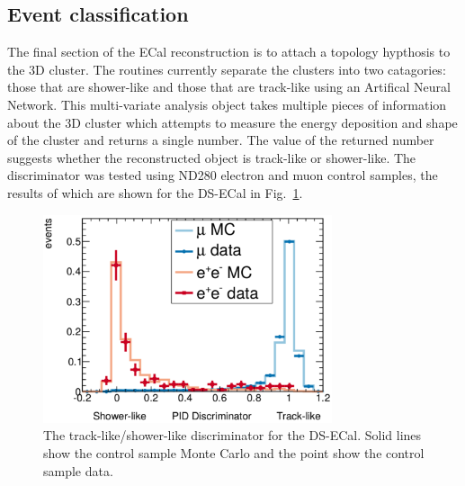 \subsection{Event classification}
\label{subsec:ECalParticleIdentification}
The final section of the ECal reconstruction is to attach a topology hypthosis to the 3D cluster.  The routines currently separate the clusters into two catagories: those that are shower-like and those that are track-like using an Artifical Neural Network.  This multi-variate analysis object takes multiple pieces of information about the 3D cluster which attempts to measure the energy deposition and shape of the cluster and returns a single number.  The value of the returned number suggests whether the reconstructed object is track-like or shower-like. The discriminator was tested using ND280 electron and muon control samples, the results of which are shown for the DS-ECal in Fig.~\ref{fig:ECalTrShVal}.

\begin{figure}
  \centering
  \includegraphics[width=8.5cm]{images/software/ecal_trshval.pdf}
  \caption{The track-like/shower-like discriminator for the DS-ECal.  Solid lines show the control sample Monte Carlo and the point show the control sample data.}
  \label{fig:ECalTrShVal}
\end{figure}


